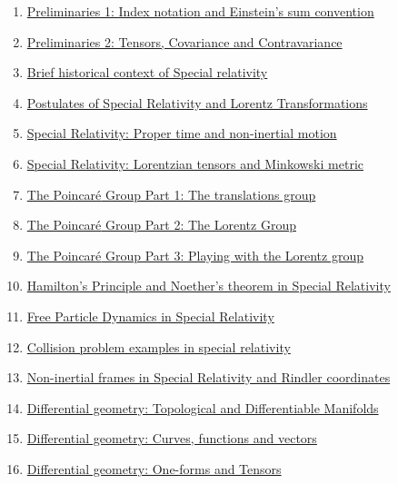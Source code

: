 \documentclass[11pt]{article}
\begin{document}
\begin{enumerate}
	\item \href{https://mp.weixin.qq.com/s/bV0mUMER_BXVhIio176h8w}{Preliminaries 1: Index notation and Einstein's sum convention}	%
	\item \href{https://mp.weixin.qq.com/s/pxFFmkYnojEosy8SLWc8Rg}{Preliminaries 2: Tensors, Covariance and Contravariance}	%
	\item \href{https://mp.weixin.qq.com/s/HWGfQuWSnjz_OvQDFBfxlg}{Brief historical context of Special relativity}	%
	\item \href{https://mp.weixin.qq.com/s/VGjT8IPlLZjqpOz-VHiI4Q}{Postulates of Special Relativity and Lorentz Transformations}	%
	\item \href{https://mp.weixin.qq.com/s/Iyy8NuaUMi-ljFAWeACT8w}{Special Relativity: Proper time and non-inertial motion}	%
	\item \href{https://mp.weixin.qq.com/s/rOfLXTUr-KYyoO7YsvzUhQ}{Special Relativity: Lorentzian tensors and Minkowski metric}	%
	\item \href{https://mp.weixin.qq.com/s/_iRGM87eFptDw4VJ8YBXTw}{The Poincar{\'e} Group Part 1: The translations group}	%
	\item \href{https://mp.weixin.qq.com/s/s1lo8M2ySY7evgIXqq5aVw}{The Poincar{\'e} Group Part 2: The Lorentz Group}	%
	\item \href{https://mp.weixin.qq.com/s/ZRXq2aouP5N43K5Xv9MjNw}{The Poincar{\'e} Group Part 3: Playing with the Lorentz group}	%
	\item \href{https://mp.weixin.qq.com/s/9fpCI5iiaAAhaswUzBxT2Q}{Hamilton's Principle and Noether's theorem in Special Relativity}	%
	\item \href{https://mp.weixin.qq.com/s/gA4kQiha_r4d6zeAYiqLng}{Free Particle Dynamics in Special Relativity}	%
	\item \href{https://mp.weixin.qq.com/s/wgnD68KcartqtfBe1E4ulA}{Collision problem examples in special relativity}	%
	\item \href{https://mp.weixin.qq.com/s/F6IyvQ-jgavscpnuLibvBg}{Non-inertial frames in Special Relativity and Rindler coordinates}	%
	\item \href{https://mp.weixin.qq.com/s/l_IkDM-xQrKIWJdwAQCesg}{Differential geometry: Topological and Differentiable Manifolds}	%
	\item \href{https://mp.weixin.qq.com/s/N-b-d4qFLkJ0dl2bk6xHmA}{Differential geometry: Curves, functions and vectors}	%
	\item \href{https://mp.weixin.qq.com/s/W22eyboGf2JTmktDK2QkMg}{Differential geometry: One-forms and Tensors}	%

\end{enumerate}
\end{document}
